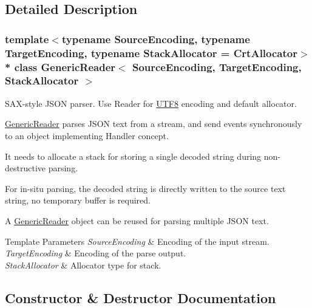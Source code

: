 \subsection{Detailed Description}
\subsubsection*{template$<$typename Source\+Encoding, typename Target\+Encoding, typename Stack\+Allocator = Crt\+Allocator$>$\\*
class Generic\+Reader$<$ Source\+Encoding, Target\+Encoding, Stack\+Allocator $>$}

S\+A\+X-\/style J\+S\+ON parser. Use Reader for \hyperlink{struct_u_t_f8}{U\+T\+F8} encoding and default allocator. 

\hyperlink{class_generic_reader}{Generic\+Reader} parses J\+S\+ON text from a stream, and send events synchronously to an object implementing Handler concept.

It needs to allocate a stack for storing a single decoded string during non-\/destructive parsing.

For in-\/situ parsing, the decoded string is directly written to the source text string, no temporary buffer is required.

A \hyperlink{class_generic_reader}{Generic\+Reader} object can be reused for parsing multiple J\+S\+ON text.


\begin{DoxyTemplParams}{Template Parameters}
{\em Source\+Encoding} & Encoding of the input stream. \\
\hline
{\em Target\+Encoding} & Encoding of the parse output. \\
\hline
{\em Stack\+Allocator} & Allocator type for stack. \\
\hline
\end{DoxyTemplParams}


\subsection{Constructor \& Destructor Documentation}
